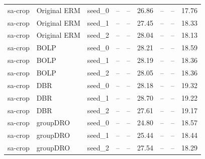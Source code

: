 \documentclass[11pt]{article}
\begin{document}
\begin{table}[h!]
{\begin{tabular}{lllcccccc}
\midrule

sa-crop & Original ERM & seed\_0 & -- & -- & 26.86 & -- & -- & 17.76 \\
sa-crop & Original ERM & seed\_1 & -- & -- & 27.45 & -- & -- & 18.33 \\
sa-crop & Original ERM & seed\_2 & -- & -- & 28.04 & -- & -- & 18.13 \\

sa-crop & BOLP & seed\_0 & -- & -- & 28.21 & -- & -- & 18.59 \\
sa-crop & BOLP & seed\_1 & -- & -- & 28.19 & -- & -- & 18.36 \\
sa-crop & BOLP & seed\_2 & -- & -- & 28.05 & -- & -- & 18.36 \\

sa-crop & DBR & seed\_0 & -- & -- & 28.18 & -- & -- & 19.32 \\
sa-crop & DBR & seed\_1 & -- & -- & 28.70 & -- & -- & 19.22 \\
sa-crop & DBR & seed\_2 & -- & -- & 27.61 & -- & -- & 19.17 \\

sa-crop & groupDRO & seed\_0 & -- & -- & 24.80 & -- & -- & 18.57 \\
sa-crop & groupDRO & seed\_1 & -- & -- & 25.44 & -- & -- & 18.44 \\
sa-crop & groupDRO & seed\_2 & -- & -- & 27.54 & -- & -- & 18.29 \\

\bottomrule
\end{tabular}%
}
\end{table}



\end{document}
